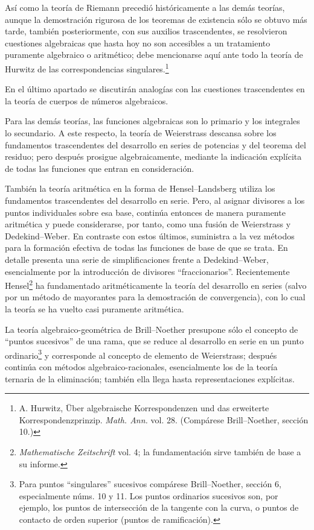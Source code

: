 \documentclass[11pt]{article}
\begin{document}
Así como la teoría de Riemann precedió históricamente a las demás teorías, aunque la demostración rigurosa de los teoremas de existencia sólo se obtuvo más tarde, también posteriormente, con sus auxilios trascendentes, se resolvieron cuestiones algebraicas que hasta hoy no son accesibles a un tratamiento puramente algebraico o aritmético; debe mencionarse aquí ante todo la teoría de Hurwitz de las correspondencias singulares.\footnote{A. Hurwitz, Über algebraische Korrespondenzen und das erweiterte Korrespondenzprinzip. \emph{Math. Ann.} vol. 28. (Compárese Brill--Noether, sección 10.)}

En el último apartado se discutirán analogías con las cuestiones trascendentes en la teoría de cuerpos de números algebraicos.

Para las demás teorías, las funciones algebraicas son lo primario y los integrales lo secundario. A este respecto, la teoría de Weierstrass descansa sobre los fundamentos trascendentes del desarrollo en series de potencias y del teorema del residuo; pero después prosigue algebraicamente, mediante la indicación explícita de todas las funciones que entran en consideración.

También la teoría aritmética en la forma de Hensel--Landsberg utiliza los fundamentos trascendentes del desarrollo en serie. Pero, al asignar divisores a los puntos individuales sobre esa base, continúa entonces de manera puramente aritmética y puede considerarse, por tanto, como una fusión de Weierstrass y Dedekind--Weber. En contraste con estos últimos, suministra a la vez métodos para la formación efectiva de todas las funciones de base de que se trata. En detalle presenta una serie de simplificaciones frente a Dedekind--Weber, esencialmente por la introducción de divisores ``fraccionarios''. Recientemente Hensel\footnote{\emph{Mathematische Zeitschrift} vol. 4; la fundamentación sirve también de base a su informe.} ha fundamentado aritméticamente la teoría del desarrollo en series (salvo por un método de mayorantes para la demostración de convergencia), con lo cual la teoría se ha vuelto casi puramente aritmética.

La teoría algebraico-geométrica de Brill--Noether presupone sólo el concepto de ``puntos sucesivos'' de una rama, que se reduce al desarrollo en serie en un punto ordinario\footnote{Para puntos ``singulares'' sucesivos compárese Brill--Noether, sección 6, especialmente núms. 10 y 11. Los puntos ordinarios sucesivos son, por ejemplo, los puntos de intersección de la tangente con la curva, o puntos de contacto de orden superior (puntos de ramificación).} y corresponde al concepto de elemento de Weierstrass; después continúa con métodos algebraico-racionales, esencialmente los de la teoría ternaria de la eliminación; también ella llega hasta representaciones explícitas.
\end{document}
